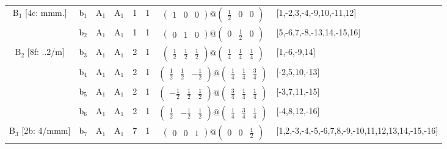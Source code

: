 \documentclass[fleqn,10pt,landscape]{article}
\begin{document}
\begin{itemize}
\begin{center}
\begin{longtable}{cc|cc|c|c|c|l}
B$_{1}$ [4c: mmm.] & b$_{1}$ & A$_{1}$ & A$_{1}$ & 1 & 1 & $\begin{pmatrix} 1 & 0 & 0 \end{pmatrix}@\begin{pmatrix} \frac{1}{2} & 0 & 0 \end{pmatrix}$ & [1,-2,3,-4,-9,10,-11,12] \\
& b$_{2}$ & A$_{1}$ & A$_{1}$ & 1 & 1 & $\begin{pmatrix} 0 & 1 & 0 \end{pmatrix}@\begin{pmatrix} 0 & \frac{1}{2} & 0 \end{pmatrix}$ & [5,-6,7,-8,-13,14,-15,16] \\ \hline
B$_{2}$ [8f: ..2/m] & b$_{3}$ & A$_{1}$ & A$_{1}$ & 2 & 1 & $\begin{pmatrix} \frac{1}{2} & \frac{1}{2} & \frac{1}{2} \end{pmatrix}@\begin{pmatrix} \frac{1}{4} & \frac{1}{4} & \frac{1}{4} \end{pmatrix}$ & [1,-6,-9,14] \\
& b$_{4}$ & A$_{1}$ & A$_{1}$ & 2 & 1 & $\begin{pmatrix} \frac{1}{2} & \frac{1}{2} & - \frac{1}{2} \end{pmatrix}@\begin{pmatrix} \frac{1}{4} & \frac{1}{4} & \frac{3}{4} \end{pmatrix}$ & [-2,5,10,-13] \\
& b$_{5}$ & A$_{1}$ & A$_{1}$ & 2 & 1 & $\begin{pmatrix} - \frac{1}{2} & \frac{1}{2} & \frac{1}{2} \end{pmatrix}@\begin{pmatrix} \frac{3}{4} & \frac{1}{4} & \frac{1}{4} \end{pmatrix}$ & [-3,7,11,-15] \\
& b$_{6}$ & A$_{1}$ & A$_{1}$ & 2 & 1 & $\begin{pmatrix} \frac{1}{2} & - \frac{1}{2} & \frac{1}{2} \end{pmatrix}@\begin{pmatrix} \frac{1}{4} & \frac{3}{4} & \frac{1}{4} \end{pmatrix}$ & [-4,8,12,-16] \\ \hline
B$_{3}$ [2b: 4/mmm] & b$_{7}$ & A$_{1}$ & A$_{1}$ & 7 & 1 & $\begin{pmatrix} 0 & 0 & 1 \end{pmatrix}@\begin{pmatrix} 0 & 0 & \frac{1}{2} \end{pmatrix}$ & [1,2,-3,-4,-5,-6,7,8,-9,-10,11,12,13,14,-15,-16] \\
\end{longtable}
\end{center}


\end{itemize}
\end{document}
